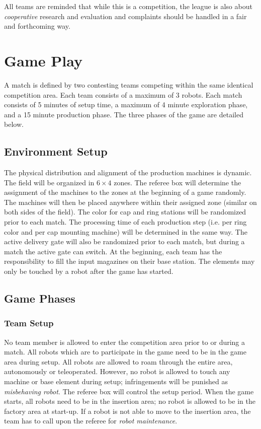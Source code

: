\documentclass[12pt,twoside]{article}
\begin{document}
All teams are reminded that while this is a competition, the league is
also about \emph{cooperative} research and evaluation and complaints
should be handled in a fair and forthcoming way.

\section{Game Play}
A match is defined by two contesting teams competing within the same
identical competition area. Each team consists of a maximum of 3
robots. Each match consists of 5 minutes of setup time, a maximum of 4
minute exploration phase, and a 15 minute production phase.
The three phases of the game are detailed below.

\subsection{Environment Setup}
\label{sec:env-setup}
The physical distribution and alignment of the production machines is
dynamic. The field will be organized in $6\times4$ zones. The referee
box will determine the assignment of the machines to the zones at the
beginning of a game randomly. The machines will then be placed
anywhere within their assigned zone (similar on both sides of the
field). The color for cap and ring stations will be randomized prior
to each match. The processing time of each production step (i.e. per
ring color and per cap mounting machine) will be determined in the
same way. The active delivery gate will also be randomized prior to
each match, but during a match the active gate can switch. At the
beginning, each team has the responsibility to fill the input
magazines on their base station. The elements may only be touched by a
robot after the game has started.

\subsection{Game Phases}
\label{sec:game-phases}

\subsubsection{Team Setup}
\label{sec:team-setup}
No team member is allowed to enter the competition area prior to or
during a match. All robots which are to participate in the game need
to be in the game area during setup. All robots are allowed to roam
through the entire area, autonomously or teleoperated. However, no
robot is allowed to touch any machine or base element during setup;
infringements will be punished as \textit{misbehaving robot}. The
referee box will control the setup period. When the game starts, all
robots need to be in the insertion area; no robot is allowed to be in
the factory area at start-up. If a robot is not able to move to the
insertion area, the team has to call upon the referee for
\textit{robot maintenance}.
\end{document}

